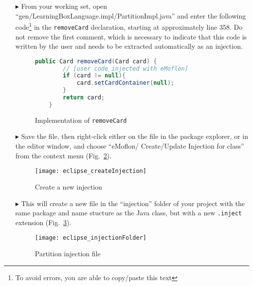 \begin{itemize}

\item[$\blacktriangleright$] From your working set, open ``gen/LearningBoxLanguage.impl/Part\-it\-ionImpl.java'' and enter the following code\footnote{To avoid
errors, you are able to copy/paste this text} in the \texttt{removeCard} declaration, starting at approximately line 358. Do not remove the first comment,
which is necessary to indicate that this code is written by the user and needs to be extracted automatically as an injection.

\vspace{0.5cm}

\begin{figure}[htbp]
        \centering
        \begin{lstlisting}[language=Java, keywordstyle={\bfseries\color{purple}}, backgroundcolor=\color{white}]
    public Card removeCard(Card card) {
        // [user code injected with eMoflon]
        if (card != null){
        	card.setCardContainer(null);
        }
        return card;
    }
        \end{lstlisting}
        \caption{Implementation of \texttt{removeCard}}
        \label{code:addToStringRep_impl}
\end{figure}

\vspace{0.5cm}

\item[$\blacktriangleright$] Save the file, then right-click either on the file in the package explorer, or in the editor window, and choose ``eMoflon/
Create/Update Injection for class'' from the context menu (Fig.~\ref{fig:injection_create_injection}).

\begin{figure}[htbp]
    \centering
    \texttt{[image: eclipse\_createInjection]}
    \caption{Create a new injection}
    \label{fig:injection_create_injection}
\end{figure}

\item[$\blacktriangleright$] This will create a new file in the ``injection'' folder of your project with the same package and name stucture as the Java class,
but with a new \texttt{.inject} extension (Fig.~\ref{fig:injection_folder}).

\begin{figure}[htbp]
    \centering
    \texttt{[image: eclipse\_injectionFolder]}
    \caption{Partition injection file}
    \label{fig:injection_folder}
\end{figure}


\end{itemize}

